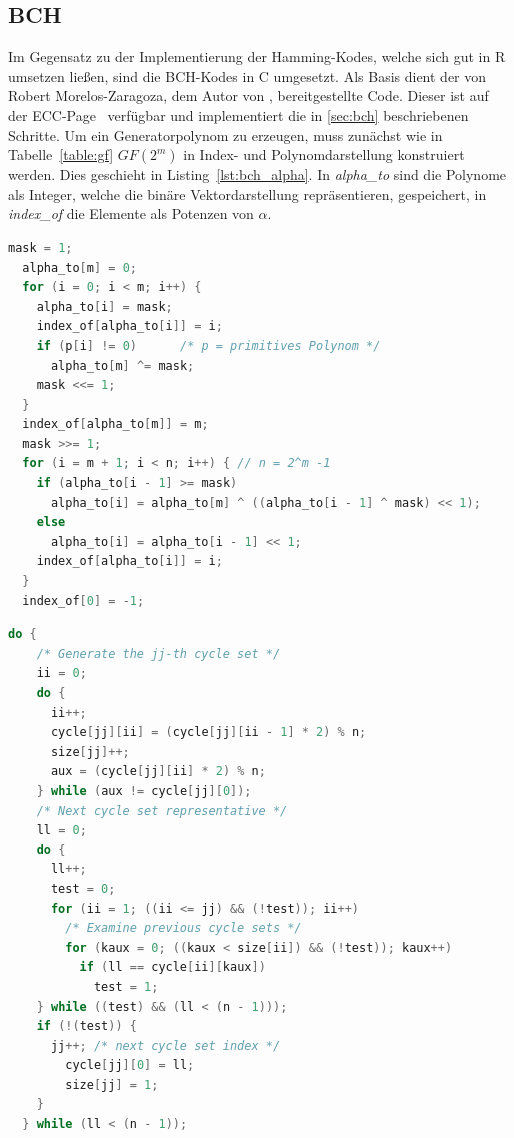 \subsection{BCH}

Im Gegensatz zu der Implementierung der Hamming-Kodes, welche sich gut in R umsetzen ließen, sind die BCH-Kodes in C umgesetzt. Als Basis dient der von Robert Morelos-Zaragoza, dem Autor von \cite{morelos2006art}, bereitgestellte Code. Dieser ist auf der ECC-Page~\cite{eccpage} verfügbar und implementiert die in \ref{sec:bch} beschriebenen Schritte. Um ein Generatorpolynom zu erzeugen, muss zunächst wie in Tabelle~\ref{table:gf} $GF(2^m)$ in Index- und Polynomdarstellung konstruiert werden. Dies geschieht in Listing~\ref{lst:bch_alpha}. In \emph{alpha\_to} sind die Polynome als Integer, welche die binäre Vektordarstellung repräsentieren, gespeichert, in \emph{index\_of} die Elemente als Potenzen von $\alpha$.
\vspace{0.5cm}
\begin{lstlisting}[caption=Konstruieren des $GF(2^m)$, label={lst:bch_alpha}, language=C]
  mask = 1;
  alpha_to[m] = 0;
  for (i = 0; i < m; i++) {
    alpha_to[i] = mask;
    index_of[alpha_to[i]] = i;
    if (p[i] != 0)		/* p = primitives Polynom */
      alpha_to[m] ^= mask;
    mask <<= 1;
  }
  index_of[alpha_to[m]] = m;
  mask >>= 1;
  for (i = m + 1; i < n; i++) {	// n = 2^m -1
    if (alpha_to[i - 1] >= mask)
      alpha_to[i] = alpha_to[m] ^ ((alpha_to[i - 1] ^ mask) << 1);
    else
      alpha_to[i] = alpha_to[i - 1] << 1;
    index_of[alpha_to[i]] = i;
  }
  index_of[0] = -1;
\end{lstlisting}

\begin{lstlisting}[caption=Finden aller Zykel $\mod 2^m-1$, label={lst:bch_cycle}, language=C++]
  do {
    /* Generate the jj-th cycle set */
    ii = 0;
    do {
      ii++;
      cycle[jj][ii] = (cycle[jj][ii - 1] * 2) % n;
      size[jj]++;
      aux = (cycle[jj][ii] * 2) % n;
    } while (aux != cycle[jj][0]);
    /* Next cycle set representative */
    ll = 0;
    do {
      ll++;
      test = 0;
      for (ii = 1; ((ii <= jj) && (!test)); ii++)
        /* Examine previous cycle sets */
        for (kaux = 0; ((kaux < size[ii]) && (!test)); kaux++)
          if (ll == cycle[ii][kaux])
            test = 1;
    } while ((test) && (ll < (n - 1)));
    if (!(test)) {
      jj++; /* next cycle set index */
        cycle[jj][0] = ll;
        size[jj] = 1;
    }
  } while (ll < (n - 1));
\end{lstlisting}


